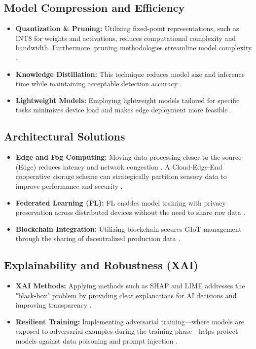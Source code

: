 \documentclass[journal]{IEEEtran}
\begin{document}
\subsection{Model Compression and Efficiency}
\begin{itemize}
    \item \textbf{Quantization \& Pruning:} Utilizing fixed-point representations, such as INT8 for weights and activations, reduces computational complexity and bandwidth. Furthermore, pruning methodologies streamline model complexity \cite{11, 16}.
    \item \textbf{Knowledge Distillation:} This technique reduces model size and inference time while maintaining acceptable detection accuracy \cite{16}.
    \item \textbf{Lightweight Models:} Employing lightweight models tailored for specific tasks minimizes device load and makes edge deployment more feasible \cite{22}.
\end{itemize}

\subsection{Architectural Solutions}
\begin{itemize}
    \item \textbf{Edge and Fog Computing:} Moving data processing closer to the source (Edge) reduces latency and network congestion \cite{30, 31}. A Cloud-Edge-End cooperative storage scheme can strategically partition sensory data to improve performance and security \cite{15}.
    \item \textbf{Federated Learning (FL):} FL enables model training with privacy preservation across distributed devices without the need to share raw data \cite{13}.
    \item \textbf{Blockchain Integration:} Utilizing blockchain secures GIoT management through the sharing of decentralized production data \cite{31, 4}.
\end{itemize}

\subsection{Explainability and Robustness (XAI)}
\begin{itemize}
    \item \textbf{XAI Methods:} Applying methods such as SHAP and LIME addresses the "black-box" problem by providing clear explanations for AI decisions and improving transparency \cite{2, 9, 3}.
    \item \textbf{Resilient Training:} Implementing adversarial training—where models are exposed to adversarial examples during the training phase—helps protect models against data poisoning and prompt injection \cite{1}.
\end{itemize}
\end{document}
